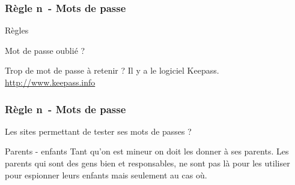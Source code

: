 \documentclass{beamer}
\newcounter{moncompteur}
\begin{document}
\begin{frame}

\frametitle{Règle n\degre \themoncompteur \  - Mots de passe}
\begin{block}{Règles}
\begin{itemize}
\end{itemize}
\end{block}

\begin{block}{Mot de passe oublié ?}
\end{block}

\begin{block}{Trop de mot de passe à retenir ?}
Il y a le logiciel Keepass. \url{http://www.keepass.info}
\end{block}

\end{frame}

\begin{frame}

\frametitle{Règle n\degre \themoncompteur \  - Mots de passe}
\begin{block}{Les sites permettant de tester ses mots de passes ?}
\begin{itemize}
\end{itemize}
\end{block}

\begin{block}{Parents - enfants}
Tant qu’on est mineur on doit les donner à ses parents. Les parents qui sont des gens bien et responsables, ne sont pas là pour les utiliser pour espionner leurs enfants mais seulement au cas où.
\end{block}

\end{frame}
\addtocounter{moncompteur}{1}
\end{document}
